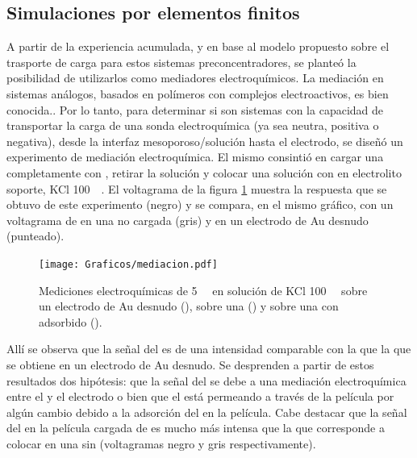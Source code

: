 	\subsection{Simulaciones por elementos finitos}	

		A partir de la experiencia acumulada, y en base al modelo propuesto sobre el trasporte de carga para estos sistemas preconcentradores, se planteó la posibilidad de utilizarlos como mediadores electroquímicos. 
    	La mediación en sistemas análogos, basados en polímeros con complejos electroactivos, es bien conocida.\cite{Kolb1993,ybarra2005}. Por lo tanto, para determinar si son sistemas con la capacidad de transportar la carga de una sonda electroquímica (ya sea neutra, positiva o negativa), desde la interfaz mesoporoso/solución hasta el electrodo, se diseñó un experimento de mediación electroquímica. El mismo consintió en cargar una \pdmF\space completamente con \ru, retirar la solución y colocar una solución con \fc\space en electrolito soporte, KCl \SI{100}{\milli\Molar}. El voltagrama de la figura \ref{fig:mediacion} muestra la respuesta que se obtuvo de este experimento (negro) y se compara, en el mismo gráfico, con un voltagrama de \fc\space en una \pdmF\space no cargada (gris) y en un electrodo de Au desnudo (punteado).  

        	\begin{figure}[th!]	
					\centering
			 	    \texttt{[image: Graficos/mediacion.pdf]}
			        \caption[Voltagrama de \ru\space y \fc.]{Mediciones electroquímicas de \fc\space \SI{5}{\milli\Molar} en solución de KCl \SI{100}{\milli\Molar} sobre un electrodo de Au desnudo (\usebox{\punteado}), sobre una \pdmF\space (\usebox{\gris}) y sobre una \pdmF\space con \ru\space adsorbido (\usebox{\negro}).}
			        \label{fig:mediacion}
			      	\end{figure}

		Allí se observa que la señal del \fc\space es de una intensidad comparable con la que la que se obtiene en un electrodo de Au desnudo. Se desprenden a partir de estos resultados dos hipótesis: que la señal del \fc\space se debe a una mediación electroquímica entre el \ru\space y el electrodo o bien que el \fc\space está permeando a través de la película por algún cambio debido a la adsorción del \ru\space en la película. Cabe destacar que la señal del \fc\space en la película cargada de \ru\space es mucho más intensa que la que corresponde a colocar \fc\space en una \pdmF\space sin \ru\space (voltagramas negro y gris respectivamente).

